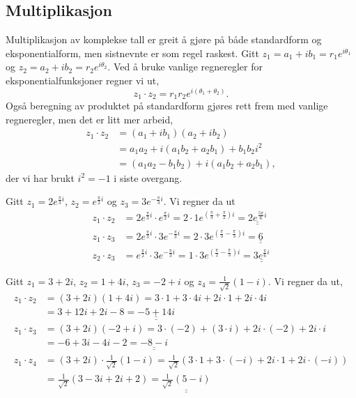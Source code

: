 \documentclass[a4paper,norsk,12pt]{article}
\newcommand{\ans}[1]{\underline{\underline{#1}}}
\newcounter{exa}
\begin{document}
\subsection{Multiplikasjon}
Multiplikasjon av komplekse tall er greit å gjøre på både standardform og eksponentialform, men sistnevnte er som regel raskest. Gitt $z_1 = a_1 + ib_1 = r_1e^{i\theta_1}$ og $z_2 = a_2+ib_2 = r_2e^{i\theta_2}$. Ved å bruke vanlige regneregler for eksponentialfunksjoner regner vi ut,
\begin{displaymath}
	z_1\cdot z_2 = r_1r_2e^{i(\theta_1+\theta_2)}.
\end{displaymath}
Også beregning av produktet på standardform gjøres rett frem med vanlige regneregler, men det er litt mer arbeid,
\begin{align*}
	z_1\cdot z_2 &= (a_1+ib_1)(a_2+ib_2) \\
		&= a_1a_2 + i(a_1b_2+a_2b_1)+b_1b_2i^2 \\
		&= (a_1a_2-b_1b_2) + i (a_1b_2+a_2b_1),
\end{align*}
der vi har brukt $i^2=-1$ i siste overgang.
\begin{texample}
Gitt $z_1 = 2e^{\frac{\pi}{3}i}$, $z_2 = e^{\frac{\pi}{2}i}$ og $z_3 = 3e^{-\frac{\pi}{3}i}$. Vi regner da ut
\begin{align*}
	z_1\cdot z_2 &= 2e^{\frac{\pi}{3}i}\cdot e^{\frac{\pi}{2}i} = 2\cdot1 e^{\left(\frac{\pi}{3}+\frac{\pi}{2}\right)i} = \ans{2e^{\frac{5\pi}{6}i}} \\
	z_1\cdot z_3 &= 2e^{\frac{\pi}{3}i}\cdot 3e^{-\frac{\pi}{3}i} = 2\cdot3 e^{\left(\frac{\pi}{3}-\frac{\pi}{3}\right)i} = \ans{6} \\
	z_2\cdot z_3 &= e^{\frac{\pi}{2}i}\cdot 3e^{-\frac{\pi}{3}i} = 1\cdot3e^{\left(\frac{\pi}{2}-\frac{\pi}{3}\right)i} = \ans{3e^{\frac{\pi}{6}i}}
\end{align*}
\end{texample}

\begin{texample}
Gitt $z_1 = 3 + 2i$, $z_2=1 + 4i$, $z_3 = -2 + i$ og $z_4 = \frac{1}{\sqrt{2}}(1-i)$. Vi regner da ut,
\begin{align*}
	z_1\cdot z_2 &= (3+2i)(1+4i) = 3\cdot1 + 3\cdot4i + 2i\cdot1 + 2i\cdot 4i \\
	&= 3 +12i+2i -8 = \ans{-5+14i} \\[12pt]
	z_1\cdot z_3 &= (3+2i)(-2+i) = 3\cdot(-2)+(3\cdot i)+2i\cdot(-2) + 2i\cdot i \\
	&= -6 + 3i -4i -2 = \ans{-8 -i} \\[12pt]
	z_1\cdot z_4 &= (3+2i)\cdot\frac{1}{\sqrt{2}}(1-i) = \frac{1}{\sqrt{2}} \left(3\cdot 1 + 3\cdot(-i) + 2i\cdot1 + 2i\cdot(-i) \right)\\
	&= \frac{1}{\sqrt{2}}\left(3-3i+2i+2\right) = \ans{\frac{1}{\sqrt{2}}(5-i)}
\end{align*} 	
\end{texample}
\end{document}
